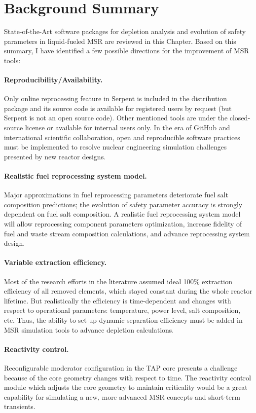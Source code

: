 \section{Background Summary}
State-of-the-Art software packages for depletion analysis and evolution of 
safety parameters in liquid-fueled \gls{MSR} are reviewed in this Chapter. 
Based on this summary, I have identified a few possible directions for 
the improvement of \gls{MSR} tools:
\paragraph{Reproducibility/Availability.} Only online reprocessing feature in 
Serpent is included in the distribution package and its source code is 
available for registered users by request (but Serpent is not an open source 
code). Other mentioned tools are under the closed-source license or available 
for internal users only. In the era of GitHub \cite{github_github_2015} and 
international scientific collaboration, open and reproducible software 
practices must be implemented to resolve nuclear engineering simulation 
challenges presented by new reactor designs.
\paragraph{Realistic fuel reprocessing system model.} 
Major approximations in fuel reprocessing parameters deteriorate fuel salt 
composition predictions; the evolution of safety parameter accuracy is 
strongly dependent on fuel salt composition. A realistic fuel reprocessing 
system model will allow reprocessing component parameters optimization,  
increase fidelity of fuel and waste stream composition calculations, and 
advance reprocessing system design.
\paragraph{Variable extraction efficiency.} Most of the research efforts in 
the literature assumed ideal 100\% extraction efficiency of all removed 
elements, which stayed 
constant during the whole reactor lifetime. But realistically the efficiency 
is time-dependent and changes with respect to operational parameters: 
temperature, power level, salt composition, etc. Thus, the ability to set up 
dynamic separation efficiency must be added in \gls{MSR} simulation tools to 
advance depletion calculations.
\paragraph{Reactivity control.} Reconfigurable moderator configuration in the 
\gls{TAP} core presents a challenge because of the core geometry changes with 
respect to time. The reactivity control module which adjusts the core geometry 
to maintain criticality would be a great capability for simulating a new, more 
advanced \gls{MSR} concepts and short-term transients.
